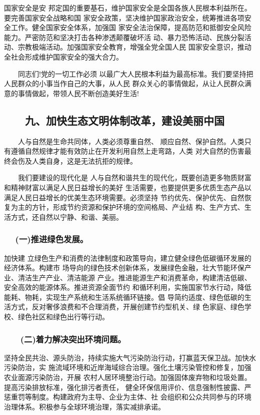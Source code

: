 \documentclass[11pt]{ctexart}
\begin{document}
{{{{国家安全是安
邦定国的重要基石，维护国家安全是全国各族人民根本利益所在。要完善国家安全战略和国
家安全政策，坚决维护国家政治安全，统筹推进各项安全工作。健全国家安全体系，加强国
家安全法治保障，提高防范和抵御安全风险能力。严密防范和坚决打击各种渗透颠覆破坏活
动、暴力恐怖活动、民族分裂活动、宗教极端活动。加强国家安全教育，增强全党全国人民
国家安全意识，推动全社会形成维护国家安全的强大合力。

　　同志们!党的一切工作必须
以最广大人民根本利益为最高标准。我们要坚持把人民群众的小事当作自己的大事，从人民
群众关心的事情做起，从让人民群众满意的事情做起，带领人民不断创造美好生活!
\subsection{　　九、加快生态文明体制改革，建设美丽中国}
\label{sec:org46e58eb}

　　人与自然是生命共同体，人类必须尊重自然、
顺应自然、保护自然。人类只有遵循自然规律才能有效防止在开发利用自然上走弯路，人类
对大自然的伤害最终会伤及人类自身，这是无法抗拒的规律。

　　我们要建设的现代化是
人与自然和谐共生的现代化，既要创造更多物质财富和精神财富以满足人民日益增长的美好
生活需要，也要提供更多优质生态产品以满足人民日益增长的优美生态环境需要。必须坚持
节约优先、保护优先、自然恢复为主的方针，形成节约资源和保护环境的空间格局、产业结
构、生产方式、生活方式，还自然以宁静、和谐、美丽。

\subsubsection{　  (一)推进绿色发展。}
\label{sec:org1cad666}

加快建
立绿色生产和消费的法律制度和政策导向，建立健全绿色低碳循环发展的经济体系。构建市
场导向的绿色技术创新体系，发展绿色金融，壮大节能环保产业、清洁生产产业、清洁能源
产业。推进能源生产和消费革命，构建清洁低碳、安全高效的能源体系。推进资源全面节约
和循环利用，实施国家节水行动，降低能耗、物耗，实现生产系统和生活系统循环链接。倡
导简约适度、绿色低碳的生活方式，反对奢侈浪费和不合理消费，开展创建节约型机关、绿
色家庭、绿色学校、绿色社区和绿色出行等行动。

\subsubsection{　　(二)着力解决突出环境问题。}
\label{sec:org3dfa87a}

坚持全民共治、源头防治，持续实施大气污染防治行动，打赢蓝天保卫战。加快水污染防治，实
施流域环境和近岸海域综合治理。强化土壤污染管控和修复，加强农业面源污染防治，开展
农村人居环境整治行动。加强固体废弃物和垃圾处置。提高污染排放标准，强化排污者责任，
健全环保信用评价、信息强制性披露、严惩重罚等制度。构建政府为主导、企业为主体、社
会组织和公众共同参与的环境治理体系。积极参与全球环境治理，落实减排承诺。

}}}}
\end{document}
